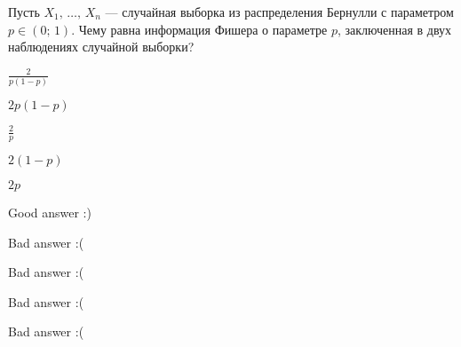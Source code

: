 
\begin{question}
Пусть \(X_1, \, \ldots, \, X_n\) --- случайная выборка из распределения
Бернулли с параметром \(p \in (0;\,1)\). Чему равна информация Фишера о
параметре \(p\), заключенная в двух наблюдениях случайной выборки?
\begin{answerlist}
  \item \(\tfrac{2}{p(1-p)}\)
  \item \(2p(1-p)\)
  \item \(\tfrac{2}{p}\)
  \item \(2(1 - p)\)
  \item \(2p\)
\end{answerlist}
\end{question}

\begin{solution}
\begin{answerlist}
  \item Good answer :)
  \item Bad answer :(
  \item Bad answer :(
  \item Bad answer :(
  \item Bad answer :(
\end{answerlist}
\end{solution}

